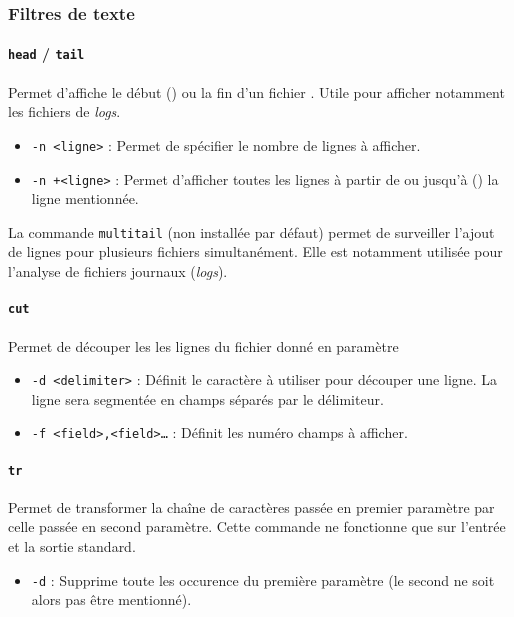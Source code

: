 \subsubsection{Filtres de texte}

\paragraph{\texttt{head} / \texttt{tail}} 
Permet d'affiche le début () ou la fin d'un fichier . Utile pour afficher notamment les fichiers de \textit{logs}.
\begin{itemize}
    \item \texttt{-n <ligne>} : Permet de spécifier le nombre de lignes à afficher.
    \item \texttt{-n +<ligne>} : Permet d'afficher toutes les lignes à partir de  ou jusqu'à () la ligne mentionnée.
\end{itemize}
 La commande \texttt{multitail} (non installée par défaut) permet de surveiller l'ajout de lignes pour plusieurs fichiers simultanément. Elle est notamment utilisée pour l'analyse de fichiers journaux (\textit{logs}).

\paragraph{\texttt{cut}} 
Permet de découper les les lignes du fichier donné en paramètre
\begin{itemize}
    \item \texttt{-d <delimiter>} : Définit le caractère à utiliser pour découper une ligne. La ligne sera segmentée en champs séparés par le délimiteur.
    \item \texttt{-f <field>,<field>\dots} : Définit les numéro champs à afficher. 
\end{itemize}

\paragraph{\texttt{tr}} 
Permet de transformer la chaîne de caractères passée en premier paramètre par celle passée en second paramètre. Cette commande ne fonctionne que sur l'entrée et la sortie standard.
\begin{itemize}
    \item \texttt{-d} : Supprime toute les occurence du première paramètre (le second ne soit alors pas être mentionné).
\end{itemize}

